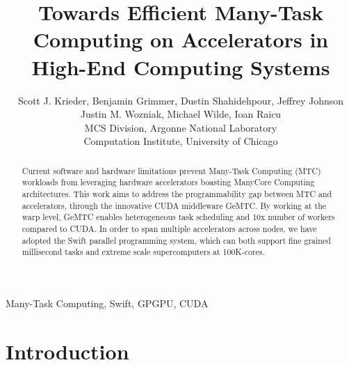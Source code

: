 \documentclass[conference]{IEEEtran}
\begin{document}
%
\title{Towards Efficient Many-Task Computing on Accelerators in High-End Computing Systems}


\author{Scott J. Krieder,
Benjamin Grimmer,
Dustin Shahidehpour,
Jeffrey Johnson\\
Justin M. Wozniak,
Michael Wilde,
Ioan Raicu\\
MCS Division, Argonne National Laboratory\\
Computation Institute, University of Chicago
}


\maketitle


\begin{abstract}
Current software and hardware limitations prevent Many-Task Computing (MTC) workloads from leveraging hardware accelerators boasting ManyCore Computing architectures. This work aims to address the programmability gap between MTC and accelerators, through the innovative CUDA middleware GeMTC. By working at the warp level, GeMTC enables heterogeneous task scheduling and 10x number of workers compared to CUDA. In order to span multiple accelerators across nodes, we have adopted the Swift parallel programming system, which can both support ﬁne grained millisecond tasks and extreme scale supercomputers at 100K-cores.
\end{abstract}

\begin{IEEEkeywords}
Many-Task Computing, Swift, GPGPU, CUDA
\end{IEEEkeywords}

\IEEEpeerreviewmaketitle

\section{Introduction}
\end{document}
